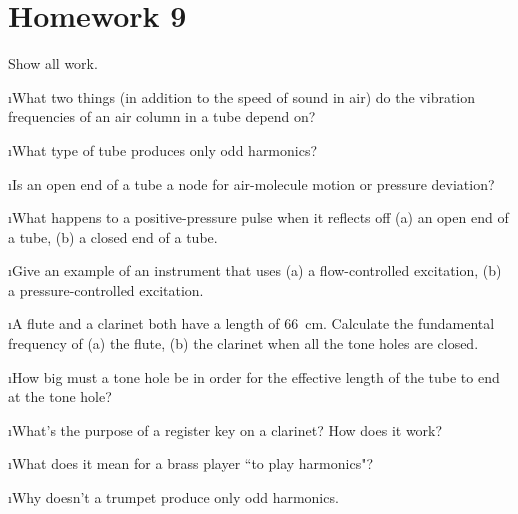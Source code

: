 \section{Homework 9}

\noindent
Show all work.

\ben

\i What two things (in addition to the speed of sound
in air) do the vibration frequencies of an air column 
in a tube depend on?

\i What type of tube produces only odd harmonics?

\i Is an open end of a tube a node for air-molecule motion
or pressure deviation?

\i What happens to a positive-pressure pulse when it
reflects off
(a) an open end of a tube, 
(b) a closed end of a tube.

\i Give an example of an instrument that uses 
(a) a flow-controlled excitation, 
(b) a pressure-controlled excitation.

\i A flute and a clarinet both have a length of 66~cm.
Calculate the fundamental frequency of 
(a) the flute, 
(b) the clarinet when all the tone holes are closed.

\i How big must a tone hole be in order for the
effective length of the tube to end at the tone
hole?

\i What's the purpose of a register key on a clarinet?
How does it work?

\i What does it mean for a brass player ``to play harmonics"?

\i Why doesn't a trumpet produce only odd harmonics.

\een

